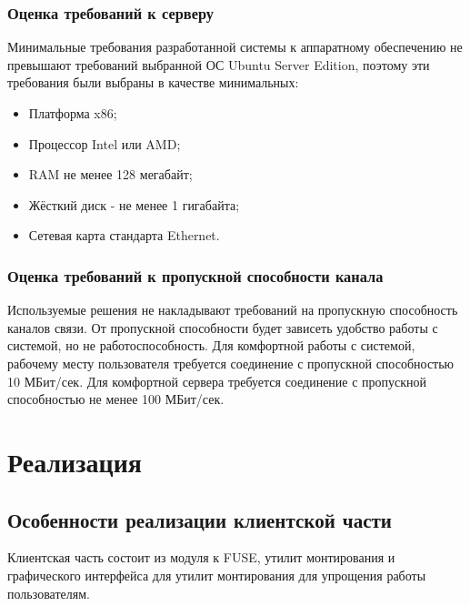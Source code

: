 \documentclass[utf8,usehyperref,12pt]{G7-32}
\begin{document}
\subsection{Оценка требований к серверу}\label{sect_infra}

Минимальные требования разработанной системы к аппаратному обеспечению не превышают требований выбранной ОС Ubuntu Server Edition\cite{ubuntu_server_req}, поэтому эти требования были выбраны в качестве минимальных:
\begin{itemize}
 \item Платформа x86;
 \item Процессор Intel или AMD;
 \item RAM не менее 128 мегабайт;
 \item Жёсткий диск - не менее 1 гигабайта;
 \item Сетевая карта стандарта Ethernet.
\end{itemize}

\subsection{Оценка требований к пропускной способности канала}\label{sect_infra}
Используемые решения не накладывают требований на пропускную способность каналов связи. От пропускной способности будет зависеть удобство работы с системой, но не работоспособность. Для комфортной работы с системой, рабочему месту пользователя требуется соединение с пропускной способностью 10 МБит/сек. Для комфортной сервера требуется соединение с пропускной способностью не менее 100 МБит/сек.

\chapter{Реализация}

\section{Особенности реализации клиентской части}
Клиентская часть состоит из модуля к FUSE, утилит монтирования и графического интерфейса для утилит монтирования для упрощения работы пользователям. 
\end{document}
